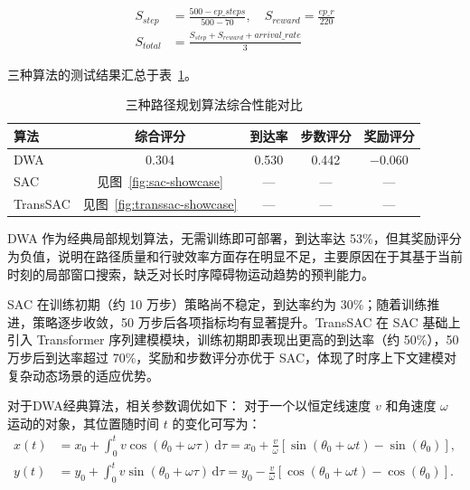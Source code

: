 \begin{equation}
\begin{aligned}
    S_{step} &= \frac{500 - ep\_steps}{500 - 70}, \quad
    S_{reward} = \frac{ep\_r}{220} \\
    S_{total} &= \frac{S_{step} + S_{reward} + arrival\_rate}{3}
\end{aligned}
\end{equation}

三种算法的测试结果汇总于表~\ref{tab:algo_comparison}。

\begin{table}[H]
    \centering
    \caption{三种路径规划算法综合性能对比}
    \label{tab:algo_comparison}
    \begin{tabular}{lcccc}
        \toprule
        \textbf{算法} & \textbf{综合评分} & \textbf{到达率} & \textbf{步数评分} & \textbf{奖励评分} \\
        \midrule
        DWA      & 0.304 & 0.530 & 0.442 & $-$0.060 \\
        SAC      & 见图~\ref{fig:sac-showcase}     & —     & —     & — \\
        TransSAC & 见图~\ref{fig:transsac-showcase} & —     & —     & — \\
        \bottomrule
    \end{tabular}
\end{table}

DWA 作为经典局部规划算法，无需训练即可部署，到达率达 53\%，但其奖励评分为负值，说明在路径质量和行驶效率方面存在明显不足，主要原因在于其基于当前时刻的局部窗口搜索，缺乏对长时序障碍物运动趋势的预判能力。

SAC 在训练初期（约 10 万步）策略尚不稳定，到达率约为 30\%；随着训练推进，策略逐步收敛，50 万步后各项指标均有显著提升。TransSAC 在 SAC 基础上引入 Transformer 序列建模模块，训练初期即表现出更高的到达率（约 50\%），50 万步后到达率超过 70\%，奖励和步数评分亦优于 SAC，体现了时序上下文建模对复杂动态场景的适应优势。

对于DWA经典算法，相关参数调优如下：
对于一个以恒定线速度 $v$ 和角速度 $\omega$ 运动的对象，其位置随时间 $t$ 的变化可写为：
\begin{equation}
\begin{aligned}
x(t) &= x_0 + \int_{0}^{t} v \cos(\theta_0 + \omega\tau) \, \mathrm{d}\tau
= x_0 + \frac{v}{\omega}\left[\sin(\theta_0 + \omega t) - \sin(\theta_0)\right],\\
y(t) &= y_0 + \int_{0}^{t} v \sin(\theta_0 + \omega\tau) \, \mathrm{d}\tau
= y_0 - \frac{v}{\omega}\left[\cos(\theta_0 + \omega t) - \cos(\theta_0)\right].
\end{aligned}
\end{equation}

